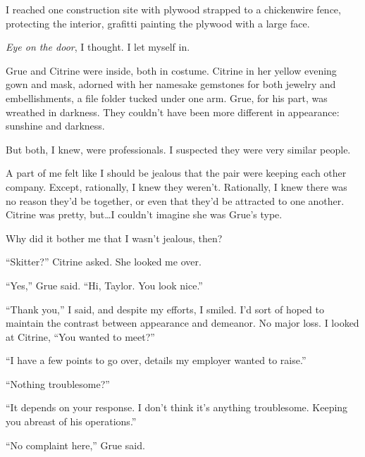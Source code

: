 I reached one construction site with plywood strapped to a chickenwire fence, protecting the interior, grafitti painting the plywood with a large face.



\emph{Eye on the door}, I thought.  I let myself in.



Grue and Citrine were inside, both in costume.  Citrine in her yellow evening gown and mask, adorned with her namesake gemstones for both jewelry and embellishments, a file folder tucked under one arm.  Grue, for his part, was wreathed in darkness.  They couldn't have been more different in appearance: sunshine and darkness.



But both, I knew, were professionals.  I suspected they were very similar people.



A part of me felt like I should be jealous that the pair were keeping each other company.  Except, rationally, I knew they weren't.  Rationally, I knew there was no reason they'd be together, or even that they'd be attracted to one another.  Citrine was pretty, but\ldots I couldn't imagine she was Grue's type.



Why did it bother me that I wasn't jealous, then?



``Skitter?'' Citrine asked.  She looked me over.



``Yes,'' Grue said.  ``Hi, Taylor.  You look nice.''



``Thank you,'' I said, and despite my efforts, I smiled.  I'd sort of hoped to maintain the contrast between appearance and demeanor.  No major loss.  I looked at Citrine, ``You wanted to meet?''



``I have a few points to go over, details my employer wanted to raise.''



``Nothing troublesome?''



``It depends on your response.  I don't think it's anything troublesome.  Keeping you abreast of his operations.''



``No complaint here,'' Grue said.



